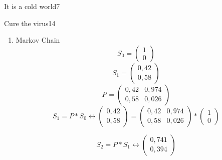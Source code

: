 \begin{questions}
\begin{question}{It is a cold world}{7}
\begin{answer}
\begin{enumerate}
		\end{enumerate}
		
	\end{answer}
		
	\end{question}

	
\begin{question}{Cure the virus}{14}		
	\begin{answer} 
	\begin{enumerate}
		\item Markov Chain
				\begin{equation}
				S_{0} = 
\begin{pmatrix}
1 \\
0

\end{pmatrix}
		\end{equation}
						\begin{equation}
				S_{1} = 
\begin{pmatrix}
0,42 \\
0,58

\end{pmatrix}
		\end{equation}
		\begin{equation}
						P_{} = 
\begin{pmatrix}
0,42 & 0,974\\
0,58 & 0,026

\end{pmatrix}
		\end{equation}
		\begin{equation}
		S_{1} = P * S_{0} \leftrightarrow \begin{pmatrix}
0,42 \\
0,58

\end{pmatrix} = \begin{pmatrix}
0,42 & 0,974\\
0,58 & 0,026

\end{pmatrix} * \begin{pmatrix}
1 \\
0

\end{pmatrix}
		\end{equation}
		
			\begin{equation}
			S_{2} = P * S_{1} \leftrightarrow \begin{pmatrix}
0,741 \\
0,394 


\end{pmatrix}
\end{equation}
\end{enumerate}
\end{answer}
\end{question}
\end{questions}
